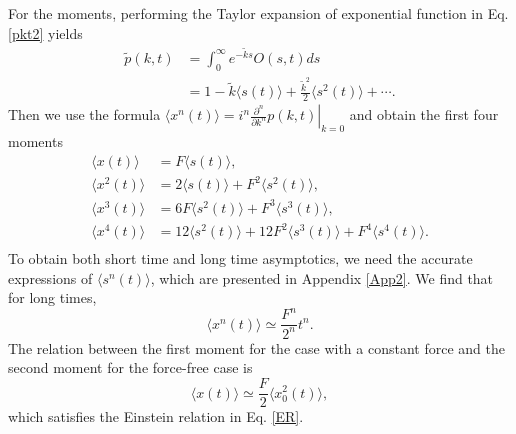 \documentclass[aps,pre,twocolumn,groupedaddress,longbibliography]{revtex4-2}
\begin{document}
For the moments, performing the Taylor expansion of exponential function in Eq. \eqref{pkt2} yields
\begin{equation}
\begin{split}
\tilde{p}(k,t)
&=\int_0^\infty e^{-\tilde{k}s} O(s,t)ds\\
&=1-\tilde{k}\langle s(t)\rangle+\frac{\tilde{k}^2}{2}\langle s^2(t)\rangle +\cdots.
\end{split}
\end{equation}
Then we use the formula $\langle x^n(t)\rangle=i^n\left.\frac{\partial^n}{\partial k^n}p(k,t)\right|_{k=0}$ and obtain the first four moments
\begin{equation}\label{Moments}
\begin{split}
\langle x(t)\rangle&=F\langle s(t)\rangle,\\
\langle x^2(t)\rangle&=2\langle s(t)\rangle+F^2\langle s^2(t)\rangle,\\
\langle x^3(t)\rangle&=6F\langle s^2(t)\rangle+F^3\langle s^3(t)\rangle,\\
\langle x^4(t)\rangle&=12\langle s^2(t)\rangle+12F^2\langle s^3(t)\rangle+F^4\langle s^4(t)\rangle.\\
\end{split}
\end{equation}
To obtain both short time and long time asymptotics, we need the accurate expressions of $\langle s^n(t)\rangle$, which are presented in Appendix \ref{App2}.
We find that for long times,
\begin{equation}\label{moments2}
  \langle x^n(t)\rangle\simeq \frac{F^n}{2^n}t^n.
\end{equation}
The relation between the first moment for the case with a constant force and the second moment for the force-free case is
\begin{equation}\label{ER-S}
  \langle x(t)\rangle \simeq \frac{F}{2}\langle x^2_0(t)\rangle,
\end{equation}
which satisfies the Einstein relation in Eq. \eqref{ER}.
\end{document}
